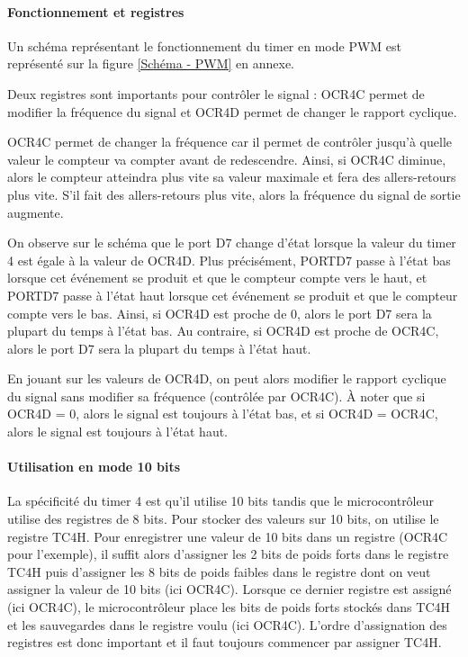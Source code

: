 \documentclass[12pt, a4paper, titlepage]{article}
\begin{document}
\paragraph{Fonctionnement et registres}

Un schéma représentant le fonctionnement du timer en mode PWM est représenté sur la figure \ref{Schéma - PWM} en annexe.

Deux registres sont importants pour contrôler le signal : OCR4C permet de modifier la fréquence du signal et OCR4D permet de changer le rapport cyclique.

OCR4C permet de changer la fréquence car il permet de contrôler jusqu'à quelle valeur le compteur va compter avant de redescendre. Ainsi, si OCR4C diminue, alors le compteur atteindra plus vite sa valeur maximale et fera des allers-retours plus vite. S'il fait des allers-retours plus vite, alors la fréquence du signal de sortie augmente.

On observe sur le schéma que le port D7 change d'état lorsque la valeur du timer 4 est égale à la valeur de OCR4D. Plus précisément, PORTD7 passe à l'état bas lorsque cet événement se produit et que le compteur compte vers le haut, et PORTD7 passe à l'état haut lorsque cet événement se produit et que le compteur compte vers le bas. Ainsi, si OCR4D est proche de 0, alors le port D7 sera la plupart du temps à l'état bas. Au contraire, si OCR4D est proche de OCR4C, alors le port D7 sera la plupart du temps à l'état haut.

En jouant sur les valeurs de OCR4D, on peut alors modifier le rapport cyclique du signal sans modifier sa fréquence (contrôlée par OCR4C). À noter que si OCR4D = 0, alors le signal est toujours à l'état bas, et si OCR4D = OCR4C, alors le signal est toujours à l'état haut.

\paragraph{Utilisation en mode 10 bits}

La spécificité du timer 4 est qu'il utilise 10 bits tandis que le microcontrôleur utilise des registres de 8 bits. Pour stocker des valeurs sur 10 bits, on utilise le registre TC4H. Pour enregistrer une valeur de 10 bits dans un registre (OCR4C pour l'exemple), il suffit alors d'assigner les 2 bits de poids forts dans le registre TC4H puis d'assigner les 8 bits de poids faibles dans le registre dont on veut assigner la valeur de 10 bits (ici OCR4C). Lorsque ce dernier registre est assigné (ici OCR4C), le microcontrôleur place les bits de poids forts stockés dans TC4H et les sauvegardes dans le registre voulu (ici OCR4C). L'ordre d'assignation des registres est donc important et il faut toujours commencer par assigner TC4H. 
\end{document}
